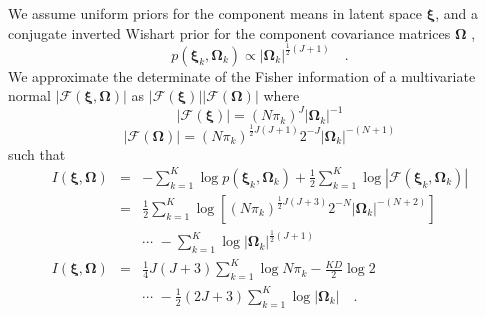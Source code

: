 \documentclass[twocolumn]{aastex62}
\newcommand{\vect}[1]{\boldsymbol{\mathbf{#1}}}
\renewcommand{\vec}[1]{\vect{#1}}
\newcommand{\weight}{\pi}
\newcommand{\scoremeans}{\vec\xi}
\newcommand{\scorecovs}{\vec\Omega}
\newcommand{\NumData}{N}
\newcommand{\NumLatentFactors}{J}
\newcommand{\NumComponents}{K}
\newcommand{\numcomponents}{k}
\begin{document}
We assume uniform priors for the component means in latent space $\scoremeans$, 
and a conjugate inverted Wishart prior for the component covariance matrices
$\scorecovs$ \citep[Section 5.2.3][]{Knorr-Held:2000},
\begin{equation}
	p(\scoremeans_\numcomponents,\scorecovs_\numcomponents) \propto |\scorecovs_\numcomponents|^{\frac{1}{2}(\NumLatentFactors + 1)} \quad .
\end{equation}
We approximate the determinate of the Fisher information of a multivariate normal $|\mathcal{F}(\scoremeans,\scorecovs)|$
as $|\mathcal{F}(\scoremeans)||\mathcal{F}(\scorecovs)|$ \citep{Oliver:1996,Figueiredo:2002} where
\begin{equation}
	|\mathcal{F}(\scoremeans)| = (\NumData\weight_k)^\NumLatentFactors|\scorecovs_k|^{-1}
\end{equation}
\begin{equation}
	|\mathcal{F}(\scorecovs)| = (\NumData\weight_k)^{\frac{1}{2}\NumLatentFactors(\NumLatentFactors+1)}2^{-\NumLatentFactors}|\scorecovs_k|^{-(\NumData+1)}
\end{equation}
\noindent{}such that 
\begin{eqnarray}
	I(\scoremeans,\scorecovs) &=& -\sum_{\numcomponents=1}^{\NumComponents}\log{p(\scoremeans_k,\scorecovs_k)} + \frac{1}{2}\sum_{\numcomponents=1}^{\NumComponents}\log{|\mathcal{F}(\scoremeans_k,\scorecovs_k)|} \nonumber \\
	&=& \frac{1}{2}\sum_{\numcomponents=1}^{\NumComponents}\log\left[(\NumData\weight_k)^{\frac{1}{2}\NumLatentFactors(\NumLatentFactors+3)}2^{-\NumData}|\scorecovs_k|^{-(\NumData + 2)}\right] \nonumber \\
	&& \cdots \,\, -\sum_{\numcomponents=1}^{\NumComponents}\log{|\scorecovs_k|}^{\frac{1}{2}(\NumLatentFactors + 1)} \\
I(\scoremeans,\scorecovs) &=& \frac{1}{4}\NumLatentFactors(\NumLatentFactors+3)\sum_{\numcomponents=1}^\NumComponents\log{\NumData\weight_k} - \frac{KD}{2}\log{2} \nonumber \\ 
&& \cdots \,\, -\frac{1}{2}(2\NumLatentFactors+3)\sum_{k=1}^{K}\log{|\scorecovs_k|}  \quad . \label{eq:prior_xi_omega} 
\end{eqnarray}
\end{document}
